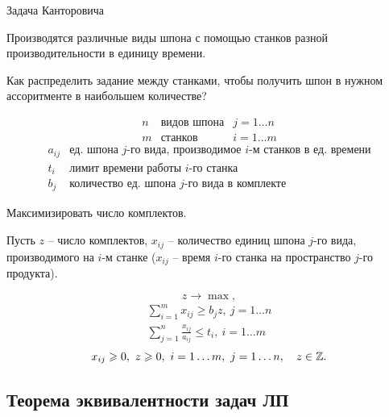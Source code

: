 
\begin{example}
    Задача Канторовича

    Производятся различные виды шпона с помощью станков разной производительности в единицу времени.

    Как распределить задание между станками, чтобы получить шпон в нужном ассоритменте в наибольшем количестве?

    \[
        \begin{array}{lll}
            n & \text{видов шпона} & j = 1\ldots n \\
            m & \text{станков}     & i = 1\ldots m
        \end{array}
    \]
    \[
        \begin{array}{ll}
            a_{ij} & \text{ед. шпона }j \text{-го вида, производимое }i \text{-м станков в ед. времени} \\
            t_i    & \text{лимит времени работы }i \text{-го станка}                                    \\
            b_j    & \text{количество ед. шпона }j \text{-го вида в комплекте}
        \end{array}
    \]

    Максимизировать число комплектов.

    Пусть $ z $ -- число комплектов, $ x_{ij} $ -- количество единиц шпона $ j $-го вида, производимого на $ i $-м станке ($ x_{ij} $ -- время $ i $-го станка на пространство $ j $-го продукта).

    \[
        z \rightarrow \max,
    \]
    \[
        \begin{array}{l}
            \sum_{i=1}^{m}x_{ij} \geqslant b_j z, \ j = 1\ldots n \\
            \sum_{j=1}^{n}\frac{x_{ij}}{a_{ij}} \leqslant t_i, \ i = 1\ldots m
        \end{array}
    \]
    \[
        x_{ij} \geqslant 0, \ z \geqslant 0, \ i = 1\ldots m, \ j = 1 \ldots n, \quad z \in \mathbb{Z}.
    \]
\end{example}

\subsection{Теорема эквивалентности задач ЛП}

